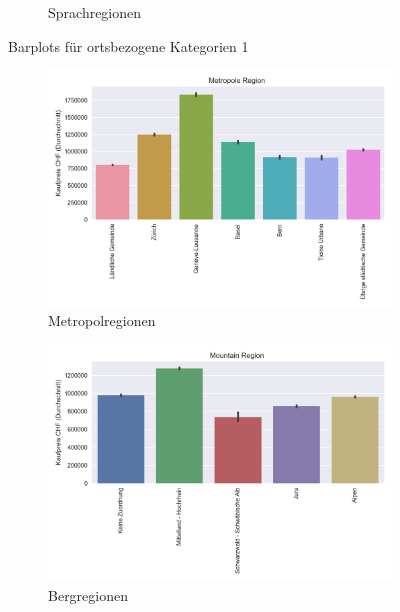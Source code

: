 \begin{figure}[h]
\begin{subfigure}{.5\textwidth}
  \caption{Sprachregionen}
\end{subfigure}
\caption{Barplots für ortsbezogene Kategorien 1}
\end{figure}

\begin{figure}[h]
\begin{subfigure}{.5\textwidth}
  \centering
  \includegraphics[width=\linewidth]{images/anhang/analysis/barplot_metropole_region_id.png}
  \caption{Metropolregionen}
\end{subfigure}
\begin{subfigure}{.5\textwidth}
  \centering
  \includegraphics[width=\linewidth]{images/anhang/analysis/barplot_mountain_region_id.png}
  \caption{Bergregionen}
\end{subfigure}
\begin{subfigure}{.5\textwidth}
  \centering

\end{subfigure}
\end{figure}

